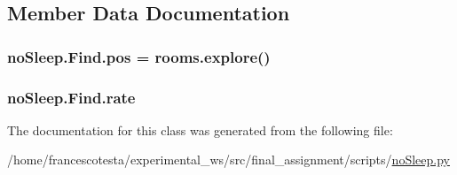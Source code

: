 \subsection{Member Data Documentation}
\subsubsection[{\texorpdfstring{pos}{pos}}]{\setlength{\rightskip}{0pt plus 5cm}no\+Sleep.\+Find.\+pos = rooms.\+explore()\hspace{0.3cm}{\ttfamily [static]}}\hypertarget{classnoSleep_1_1Find_a3b10497b340f42598a97d7dc4c3823a6}{}\label{classnoSleep_1_1Find_a3b10497b340f42598a97d7dc4c3823a6}
\subsubsection[{\texorpdfstring{rate}{rate}}]{\setlength{\rightskip}{0pt plus 5cm}no\+Sleep.\+Find.\+rate\hspace{0.3cm}{\ttfamily [static]}}\hypertarget{classnoSleep_1_1Find_a29d9bba04c1821d063ab293ef4512b02}{}\label{classnoSleep_1_1Find_a29d9bba04c1821d063ab293ef4512b02}


The documentation for this class was generated from the following file\+:\begin{DoxyCompactItemize}
\item 
/home/francescotesta/experimental\+\_\+ws/src/final\+\_\+assignment/scripts/\hyperlink{noSleep_8py}{no\+Sleep.\+py}\end{DoxyCompactItemize}
